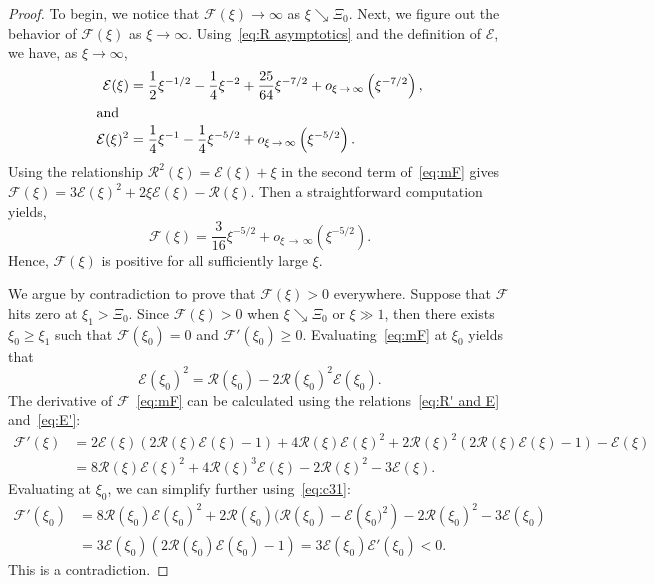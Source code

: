 \documentclass[AHL,Unicode,longabstracts]{cedram}
\newcommand{\mE}{\mathcal{E}}
\newcommand{\mF}{\mathcal{F}}
\newcommand{\mR}{\mathcal{R}}
\newcommand{\1}{\mathds{1}}
\begin{document}
\begin{proof}
To begin, we notice that $\mF(\xi) \to \infty$ as $\xi \searrow \Xi_0$. Next, we figure out the behavior of $\mF(\xi)$ as $\xi\to\infty$. Using~\eqref{eq:R asymptotics} and the definition of $\mE$, we have, as $\xi\to \infty$,
\begin{align*}
\mE(\xi) &= \frac{1}{2}\xi^{-1/2} - \frac{1}{4}\xi^{-2}+\frac{25}{64} \xi^{-7/2} + o_{\xi\,\rightarrow\,\infty}\left(\xi^{-7/2}\right), \\
\intertext{and}
\mE(\xi)^2 &= \frac{1}{4}\xi^{-1} - \frac{1}{4}\xi^{-5/2} + o_{\xi\,\rightarrow\,\infty}\left(\xi^{-5/2}\right).
\end{align*}
Using the relationship $\mR^2(\xi)=\mE(\xi)+\xi$ in the second term of~\eqref{eq:mF} gives $\mF(\xi) = 3\mE(\xi)^2 + 2 \xi \mE(\xi) - \mR(\xi)$. Then a straightforward computation yields,
\[
\mF(\xi) = \frac{3}{16}\xi^{-5/2}+o_{\xi\,\rightarrow\,\infty}\left(\xi^{-5/2}\right).
\]
Hence, $\mF(\xi)$ is positive for all sufficiently large $\xi$.



We argue by contradiction to prove that $\mF(\xi)>0$ everywhere. Suppose that $\mF$ hits zero at $\xi_1>\Xi_0$. Since $\mF(\xi) >0$ when $\xi \searrow \Xi_0$ or $\xi \gg 1$, then there exists $\xi_0 \geq \xi_1$ such that $\mF(\xi_0) = 0$ and $\mF'(\xi_0) \geq 0$. Evaluating~\eqref{eq:mF} at $\xi_0$ yields that
\begin{equation}\label{eq:c31}
\mE(\xi_0)^2 = \mR(\xi_0) - 2\mR(\xi_0)^2\mE(\xi_0).
\end{equation}
The derivative of $\mF$~\eqref{eq:mF} can be calculated using the relations~\eqref{eq:R' and E} and~\eqref{eq:E'}:
\begin{align*}
\mF'(\xi) & = 2 \mE(\xi)\left(2 \mR(\xi) \mE(\xi) - 1 \right) + 4\mR(\xi) \mE(\xi)^2 + 2\mR(\xi)^2 \left (2 \mR(\xi) \mE(\xi) - 1 \right) - \mE(\xi) \\
& = 8\mR(\xi) \mE(\xi)^2 + 4 \mR(\xi)^3\mE(\xi) - 2\mR(\xi)^2 - 3\mE(\xi).
\end{align*}
Evaluating at $\xi_0$, we can simplify further using~\eqref{eq:c31}:
\begin{align*}
\mF'(\xi_0) & = 8\mR(\xi_0) \mE(\xi_0)^2 + 2 \mR(\xi_0) (\mR(\xi_0) - \mE\left(\xi_0)^2\right) - 2\mR(\xi_0)^2 - 3\mE(\xi_0)\\
& = 3\mE(\xi_0) \left(2 \mR(\xi_0) \mE(\xi_0) - 1\right) = 3\mE(\xi_0)\mE'(\xi_0) < 0.
\end{align*}
This is a contradiction.
\end{proof}
\end{document}
